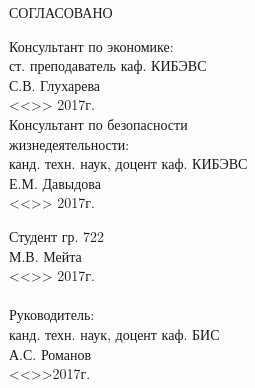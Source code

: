СОГЛАСОВАНО
\vspace{0.01cm}
\begin{singlespace}
 \begin{minipage}[left]{0.40\linewidth}
 Консультант по экономике:\\
 ст. преподаватель каф. КИБЭВС \\
 \underline{\hspace{2.5cm}}С.В. Глухарева \\
 <<\underline{\hspace{1cm}}>>\underline{\hspace{3cm}} 2017г.\\

 Консультант по безопасности\\ жизнедеятельности:\\
 канд. техн. наук, доцент каф. КИБЭВС\\
 \underline{\hspace{2.5cm}}Е.М. Давыдова\\
 <<\underline{\hspace{1cm}}>>\underline{\hspace{3cm}} 2017г.\\
 \end{minipage}
 \hfill
 \begin{minipage}[left]{0.5\linewidth}
  \vspace{0.5cm}
  Студент гр. 722 \\
  \underline{\hspace{3cm}}М.В. Мейта  \\
 <<\underline{\hspace{1cm}}>>\underline{\hspace{3cm}} 2017г.\\
 \vspace{1.3cm}\\ 
  Руководитель: \\
  канд. техн. наук, доцент каф. БИС \\
  \underline{\hspace{3cm}} А.С. Романов \\
  <<\underline{\hspace{1cm}}>>\underline{\hspace{3cm}}2017г.\\
 \end{minipage}
\end{singlespace}



